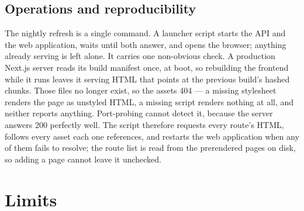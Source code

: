 \documentclass[11pt,a4paper]{article}
\begin{document}
\subsection{Operations and reproducibility}

The nightly refresh is a single command. A launcher script starts the API and the web
application, waits until both answer, and opens the browser; anything already serving
is left alone. It carries one non-obvious check. A production Next.js server reads its
build manifest once, at boot, so rebuilding the frontend while it runs leaves it
serving HTML that points at the previous build's hashed chunks. Those files no longer
exist, so the assets 404 --- a missing stylesheet renders the page as unstyled HTML, a
missing script renders nothing at all, and neither reports anything. Port-probing
cannot detect it, because the server answers 200 perfectly well. The script therefore
requests every route's HTML, follows every asset each one references, and restarts the
web application when any of them fails to resolve; the route list is read from the
prerendered pages on disk, so adding a page cannot leave it unchecked.

\section{Limits}
\label{sec:limits}
\end{document}
